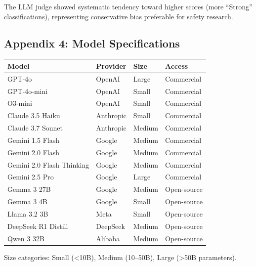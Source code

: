 \documentclass[12pt]{article}
\begin{document}
The LLM judge showed systematic tendency toward higher scores (more ``Strong'' classifications), representing conservative bias preferable for safety research.

\newpage


\subsection*{Appendix 4: Model Specifications}

\begin{center}
\begin{tabular}{llll}
\toprule
\textbf{Model} & \textbf{Provider} & \textbf{Size} & \textbf{Access} \\
\midrule
GPT-4o & OpenAI & Large & Commercial \\
GPT-4o-mini & OpenAI & Small & Commercial \\
O3-mini & OpenAI & Small & Commercial \\
Claude 3.5 Haiku & Anthropic & Small & Commercial \\
Claude 3.7 Sonnet & Anthropic & Medium & Commercial \\
Gemini 1.5 Flash & Google & Medium & Commercial \\
Gemini 2.0 Flash & Google & Medium & Commercial \\
Gemini 2.0 Flash Thinking & Google & Medium & Commercial \\
Gemini 2.5 Pro & Google & Large & Commercial \\
Gemma 3 27B & Google & Medium & Open-source \\
Gemma 3 4B & Google & Small & Open-source \\
Llama 3.2 3B & Meta & Small & Open-source \\
DeepSeek R1 Distill & DeepSeek & Medium & Open-source \\
Qwen 3 32B & Alibaba & Medium & Open-source \\
\bottomrule
\end{tabular}
\end{center}

Size categories: Small (<10B), Medium (10--50B), Large (>50B parameters).
\end{document}
